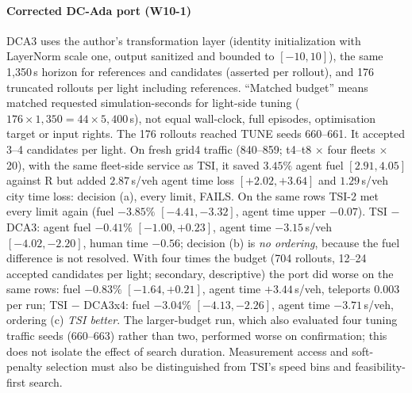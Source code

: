\paragraph{Corrected DC-Ada port (W10-1)}
DCA3 uses the author's transformation layer (identity initialization with LayerNorm scale one, output sanitized and bounded to $[-10,10]$), the same 1,350\,s horizon for references and candidates (asserted per rollout), and 176 truncated rollouts per light including references. ``Matched budget'' means matched requested simulation-seconds for
light-side tuning ($176\times1{,}350=44\times5{,}400$\,s), not equal wall-clock, full episodes, optimisation target or input rights.
The 176 rollouts reached TUNE seeds 660--661. It accepted 3--4 candidates per light. On fresh grid4 traffic (840--859; t4--t8 $\times$ four fleets $\times$ 20), with the same fleet-side service as TSI, it saved $3.45\%$ agent fuel $[2.91,4.05]$ against R but added $2.87$\,s/veh agent time loss $[+2.02,+3.64]$ and $1.29$\,s/veh city time loss: decision (a), every limit, FAILS. On the same rows TSI-2 met every limit again (fuel $-3.85\%$ $[-4.41,-3.32]$, agent time upper $-0.07$). TSI $-$ DCA3: agent fuel $-0.41\%$ $[-1.00,+0.23]$, agent time $-3.15$\,s/veh $[-4.02,-2.20]$, human time $-0.56$; decision (b) is \emph{no ordering}, because the fuel difference is not resolved. With four times the budget (704 rollouts, 12--24 accepted candidates per light; secondary, descriptive) the port did worse on the same rows: fuel $-0.83\%$ $[-1.64,+0.21]$, agent time $+3.44$\,s/veh, teleports $0.003$ per run; TSI $-$ DCA3x4: fuel $-3.04\%$ $[-4.13,-2.26]$, agent time $-3.71$\,s/veh, ordering (c) \emph{TSI better}. The larger-budget run, which also evaluated four tuning traffic seeds (660--663) rather than two, performed worse on confirmation; this
does not isolate the effect of search duration. Measurement access and soft-penalty selection must also be distinguished from TSI's speed bins and feasibility-first search.

